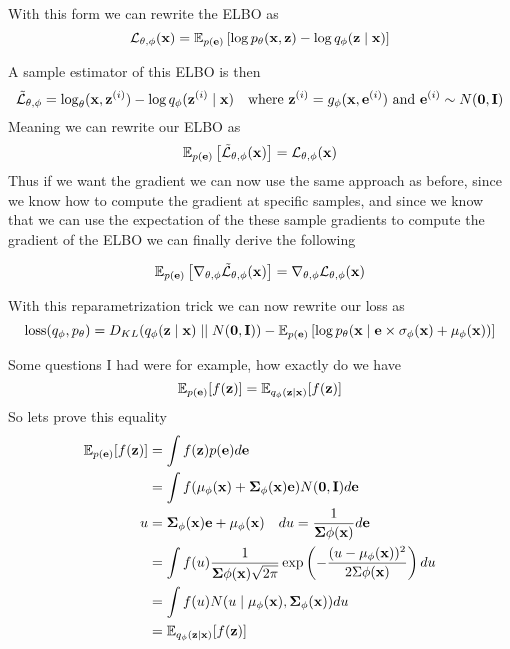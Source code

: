 \documentclass[12pt]{article}
\begin{document}
With this form we can rewrite the ELBO as 
\[
    \mathcal L_{\theta, \phi}(\mathbf{x}) = \operatorname{\mathbb{E}}_{p(\mathbf{e})} \left[ \log p_\theta(\mathbf{x}, \mathbf{z}) - \log q_\phi(\mathbf{z}\mid \mathbf{x})\right]
\]

A sample estimator of this ELBO is then 
\[
    \tilde{\mathcal L}_{\theta, \phi} = \log_\theta(\mathbf{x}, \mathbf{z}^{(i)}) - \log q_\phi(\mathbf{z}^{(i)}\mid \mathbf{x}) \quad \text{where } \mathbf{z}^{(i)} = g_\phi(\mathbf{x}, \mathbf{e}^{(i)}) \text{ and } \mathbf{e}^{(i)} \sim N(\mathbf{0}, \mathbf{I})
\]
Meaning we can rewrite our ELBO as 
\[
    \operatorname{\mathbb{E}}_{p(\mathbf{e})} \left[ \tilde{\mathcal L}_{\theta, \phi}(\mathbf{x}) \right] = \mathcal L_{\theta, \phi}(\mathbf{x})
\]
Thus if we want the gradient we can now use the same approach as before, since we know how to compute the gradient at specific samples, and since we know that we can use the expectation of the these sample gradients to compute the gradient of the ELBO we can finally derive the following 

\begin{align*}
    \operatorname{\mathbb{E}}_{p(\mathbf{e})} \left[\nabla _{\theta, \phi}\tilde{\mathcal L}_{\theta, \phi}(\mathbf{x})\right] = \nabla_{\theta, \phi}\mathcal L_{\theta, \phi}(\mathbf{x})
\end{align*}

With this reparametrization trick we can now rewrite our loss as 
\[
    \text{loss}(q_\phi, p_\theta) = D_{KL}(q_\phi(\mathbf{z}\mid \mathbf{x}) \mid\mid N(\mathbf{0}, \mathbf{I})) - \operatorname{\mathbb{E}}_{p(\mathbf{e})} \left[ \log p_\theta(\mathbf{x} \mid \mathbf{e}\times \sigma_\phi(\mathbf{x}) + \mu_\phi(\mathbf{x})) \right]
\]

Some questions I had were for example, how exactly do we have 
\[
    \operatorname{\mathbb{E}}_{p(\mathbf{e})}[f(\mathbf{z})] = \operatorname{\mathbb{E}}_{q_\phi(\mathbf{z}\mid \mathbf{x})}[f(\mathbf{z})]   
\]
So lets prove this equality 
\begin{align*}
    \EX_{p(\bvec e)}[f(\bvec z)] &= \int f(\bvec z)p(\bvec e)d\bvec e \\
    &= \int f(\mu_\phi(\bvec x) + \bvec \Sigma_\phi(\bvec x)\bvec e)N(\bvec 0, \bvec I)d\bvec e \\
    u &= \bvec \Sigma_\phi(\bvec x)\bvec e + \mu_\phi(\bvec x) \quad du = \frac{1}{\bvec \Sigma\phi(\bvec x)}d\bvec e \\
    &= \int f(u)\frac{1}{\bvec \Sigma\phi(\bvec x)\sqrt{2\pi}}\exp\left(-\frac{(u-\mu_\phi(\bvec x))^2}{2\bvec \bvec \Sigma\phi(\bvec x)}\right)du\\
    &= \int f(u)N(u\mid \mu_\phi(\bvec x), \bvec \Sigma_\phi(\bvec x))du \\
    &= \EX_{q_\phi(\bvec z\mid \bvec x)}[f(\bvec z)]
\end{align*}
\end{document}
